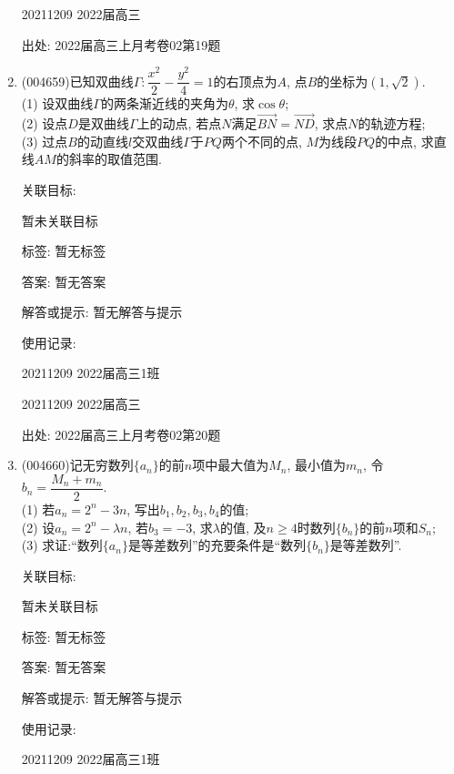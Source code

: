 \documentclass[10pt,a4paper]{article}
\begin{document}
\begin{enumerate}[1.]
20211209	2022届高三		


出处: 2022届高三上月考卷02第19题
\item { (004659)}已知双曲线$\Gamma:\dfrac{x^2}2-\dfrac{y^2}4=1$的右顶点为$A$, 点$B$的坐标为$(1,\sqrt 2)$.\\
(1) 设双曲线$\Gamma$的两条渐近线的夹角为$\theta$, 求$\cos\theta$;\\
(2) 设点$D$是双曲线$\Gamma$上的动点, 若点$N$满足$\overrightarrow{BN}=\overrightarrow{ND}$, 求点$N$的轨迹方程;\\
(3) 过点$B$的动直线$l$交双曲线$\Gamma$于$PQ$两个不同的点, $M$为线段$PQ$的中点, 求直线$AM$的斜率的取值范围.


关联目标:

暂未关联目标



标签: 暂无标签

答案: 暂无答案

解答或提示: 暂无解答与提示

使用记录:

20211209	2022届高三1班			

20211209	2022届高三			


出处: 2022届高三上月考卷02第20题
\item { (004660)}记无穷数列$\{a_n\}$的前$n$项中最大值为$M_n$, 最小值为$m_n$, 令$b_n=\dfrac{M_n+m_n}{2}$.\\
(1) 若$a_n=2^n-3n$, 写出$b_1,b_2,b_3,b_4$的值;\\
(2) 设$a_n=2^n-\lambda n$, 若$b_3=-3$, 求$\lambda$的值, 及$n\ge 4$时数列$\{b_n\}$的前$n$项和$S_n$;\\
(3) 求证:``数列$\{a_n\}$是等差数列''的充要条件是``数列$\{b_n\}$是等差数列''.


关联目标:

暂未关联目标



标签: 暂无标签

答案: 暂无答案

解答或提示: 暂无解答与提示

使用记录:

20211209	2022届高三1班			


\end{enumerate}
\end{document}
